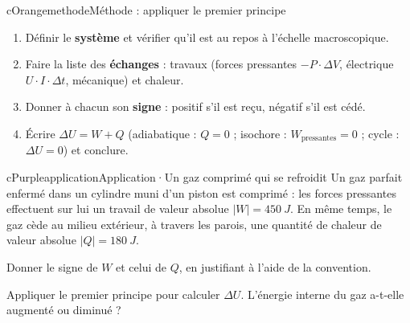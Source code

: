 \documentclass[11pt,a4paper]{article}
\begin{document}
\begin{encart}{cOrange}{methode}{Méthode : appliquer le premier principe}
\begin{enumerate}[label={\sffamily\bfseries\color{cOrange}\arabic*.}, leftmargin=5mm, itemsep=0pt, topsep=1pt]
  \item Définir le \textbf{système} et vérifier qu’il est au repos à l’échelle macroscopique.
  \item Faire la liste des \textbf{échanges} : travaux (forces pressantes $-P\cdot\Delta V$, électrique $U\cdot I\cdot\Delta t$, mécanique) et chaleur.
  \item Donner à chacun son \textbf{signe} : positif s’il est reçu, négatif s’il est cédé.
  \item Écrire $\Delta U = W + Q$ (adiabatique : $Q = 0$ ; isochore : $W_{\text{pressantes}} = 0$ ; cycle : $\Delta U = 0$) et conclure.
\end{enumerate}
\end{encart}

\begin{rub}[unbreakable]{cPurple}{application}{Application\enspace·\enspace Un gaz comprimé qui se refroidit}
Un gaz parfait enfermé dans un cylindre muni d’un piston est comprimé : les forces pressantes effectuent sur lui un travail de valeur absolue $|W| = \qty{450}{J}$. En même temps, le gaz cède au milieu extérieur, à travers les parois, une quantité de chaleur de valeur absolue $|Q| = \qty{180}{J}$.
\begin{appq}
  \item Donner le signe de $W$ et celui de $Q$, en justifiant à l’aide de la convention.
  \item Appliquer le premier principe pour calculer $\Delta U$. L’énergie interne du gaz a-t-elle augmenté ou diminué ?
\end{appq}
\end{rub}
\end{document}
